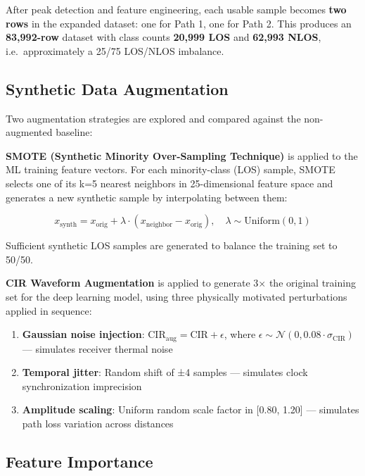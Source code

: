 \documentclass[12pt,a4paper]{article}
\providecommand{\tightlist}{%
  \setlength{\itemsep}{0pt}\setlength{\parskip}{0pt}}
\begin{document}
After peak detection and feature engineering, each usable sample becomes
\textbf{two rows} in the expanded dataset: one for Path 1, one for Path
2. This produces an \textbf{83,992-row} dataset with class counts
\textbf{20,999 LOS} and \textbf{62,993 NLOS}, i.e.~approximately a 25/75
LOS/NLOS imbalance.

\subsection{Synthetic Data
Augmentation}\label{synthetic-data-augmentation}

Two augmentation strategies are explored and compared against the
non-augmented baseline:

\textbf{SMOTE (Synthetic Minority Over-Sampling Technique)} is applied
to the ML training feature vectors. For each minority-class (LOS)
sample, SMOTE selects one of its k=5 nearest neighbors in 25-dimensional
feature space and generates a new synthetic sample by interpolating
between them:

\[x_{\mathrm{synth}} = x_{\mathrm{orig}} + \lambda \cdot (x_{\mathrm{neighbor}} - x_{\mathrm{orig}}), \quad \lambda \sim \mathrm{Uniform}(0, 1)\]

Sufficient synthetic LOS samples are generated to balance the training
set to 50/50.

\textbf{CIR Waveform Augmentation} is applied to generate 3× the
original training set for the deep learning model, using three
physically motivated perturbations applied in sequence:

\begin{enumerate}
\def\labelenumi{\arabic{enumi}.}
\tightlist
\item
  \textbf{Gaussian noise injection}:
  \(\mathrm{CIR}_{\mathrm{aug}} = \mathrm{CIR} + \epsilon\), where
  \(\epsilon \sim \mathcal{N}(0, 0.08 \cdot \sigma_{\mathrm{CIR}})\) ---
  simulates receiver thermal noise
\item
  \textbf{Temporal jitter}: Random shift of ±4 samples --- simulates
  clock synchronization imprecision
\item
  \textbf{Amplitude scaling}: Uniform random scale factor in {[}0.80,
  1.20{]} --- simulates path loss variation across distances
\end{enumerate}

\subsection{Feature Importance}\label{feature-importance}
\end{document}

